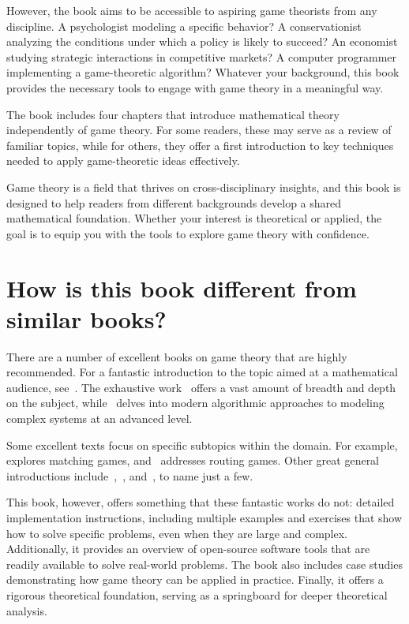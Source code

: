 However, the book aims to be accessible to aspiring game theorists from any
discipline. A psychologist modeling a specific behavior? A conservationist
analyzing the conditions under which a policy is likely to succeed? An economist
studying strategic interactions in competitive markets? A computer programmer
implementing a game-theoretic algorithm? Whatever your background, this book
provides the necessary tools to engage with game theory in a meaningful way.  

The book includes four chapters that introduce mathematical theory independently
of game theory. For some readers, these may serve as a review of familiar
topics, while for others, they offer a first introduction to key techniques
needed to apply game-theoretic ideas effectively.  

Game theory is a field that thrives on cross-disciplinary insights, and this
book is designed to help readers from different backgrounds develop a shared
mathematical foundation. Whether your interest is theoretical or applied, the
goal is to equip you with the tools to explore game theory with confidence.  

\section{How is this book different from similar books?}

There are a number of excellent books on game theory that are highly
recommended. For a fantastic introduction to the topic aimed at a mathematical
audience, see~\cite{webb2007game}. The exhaustive work~\cite{maschler2020game}
offers a vast amount of breadth and depth on the subject,
while~\cite{roughgarden2010algorithmic} delves into modern algorithmic
approaches to modeling complex systems at an advanced level.

Some excellent texts focus on specific subtopics within the domain. For
example,~\cite{gusfield1989stable} explores matching games,
and~\cite{roughgarden2002selfish} addresses routing games. Other great general
introductions include~\cite{osborne2004introduction},~\cite{watson2002strategy},
and~\cite{gusfield1989stable}, to name just a few.

This book, however, offers something that these fantastic works do not: detailed
implementation instructions, including multiple examples and exercises that show
how to solve specific problems, even when they are large and complex.
Additionally, it provides an overview of open-source software tools that are
readily available to solve real-world problems. The book also includes case
studies demonstrating how game theory can be applied in practice. Finally, it
offers a rigorous theoretical foundation, serving as a springboard for deeper
theoretical analysis.

